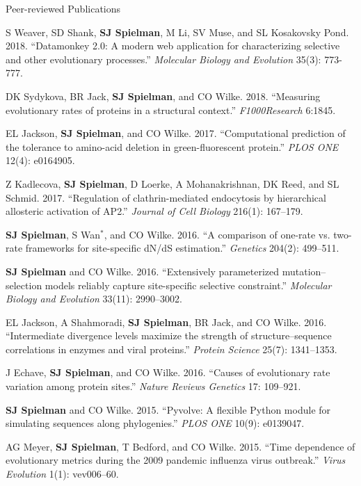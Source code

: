 \documentclass{resume} %
\begin{document}
\begin{rSection}{Peer-reviewed Publications}
\begin{etaremune}[leftmargin=1.5em]
\item S Weaver, SD Shank, \textbf{SJ Spielman}, M Li, SV Muse, and SL Kosakovsky Pond. 2018. ``Datamonkey 2.0: A modern web application for characterizing selective and other evolutionary processes.'' \emph{Molecular Biology and Evolution} 35(3): 773-777.

\item DK Sydykova, BR Jack, \textbf{SJ Spielman}, and CO Wilke. 2018. ``Measuring evolutionary rates of proteins in a structural context.'' \emph{F1000Research} 6:1845.

\item EL Jackson, \textbf{SJ Spielman}, and CO Wilke. 2017. ``Computational prediction of the tolerance to amino-acid deletion in green-fluorescent protein.'' \emph{PLOS ONE} 12(4): e0164905.

\item Z Kadlecova, \textbf{SJ Spielman}, D Loerke, A Mohanakrishnan, DK Reed, and SL Schmid. 2017. ``Regulation of clathrin-mediated endocytosis by hierarchical allosteric activation of AP2.'' \emph{Journal of Cell Biology} 216(1): 167--179.

\item \textbf{SJ Spielman}, S Wan$^\ast$, and CO Wilke. 2016. ``A comparison of one-rate vs. two-rate frameworks for site-specific dN/dS estimation.'' \emph{Genetics} 204(2): 499--511.

\item \textbf{SJ Spielman} and CO Wilke. 2016. ``Extensively parameterized mutation--selection models reliably capture site-specific selective constraint.'' \emph{Molecular Biology and Evolution} 33(11): 2990--3002.

\item EL Jackson, A Shahmoradi, \textbf{SJ Spielman}, BR Jack, and CO Wilke. 2016. ``Intermediate divergence levels maximize the strength of structure--sequence correlations in enzymes and viral proteins.'' \emph{Protein Science} 25(7): 1341--1353.

\item J Echave, \textbf{SJ Spielman}, and CO Wilke. 2016. ``Causes of evolutionary rate variation among protein sites.'' \emph{Nature Reviews Genetics} 17: 109--921.

\item \textbf{SJ Spielman} and CO Wilke. 2015. ``Pyvolve: A flexible Python module for simulating sequences along phylogenies.'' \emph{PLOS ONE} 10(9): e0139047.

\item AG Meyer, \textbf{SJ Spielman}, T Bedford, and CO Wilke. 2015. ``Time dependence of evolutionary metrics during the 2009 pandemic influenza virus outbreak.'' \emph{Virus Evolution} 1(1): vev006--60.


\end{etaremune}
\end{rSection}
\end{document}
